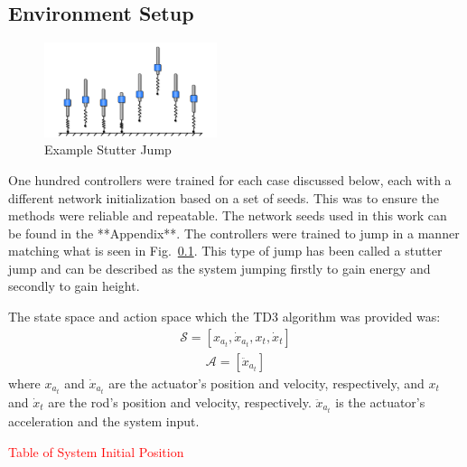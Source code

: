 \documentclass[letterpaper, 10 pt, conference]{ieeeconf}  %
\begin{document}
\subsection{Environment Setup}
% 
\begin{figure}[t]
        \begin{center}
        \includegraphics[width=0.45\textwidth]{figures/Monoped_System/stutter_jump.png}
        \caption{Example Stutter Jump}
        \label{fig:stutterJump} 
        \end{center}
\end{figure}
% 
One hundred controllers were trained for each case discussed below, each with a different network initialization based on a set of seeds. This was to ensure the methods were reliable and repeatable. The network seeds used in this work can be found in the **Appendix**. The controllers were trained to jump in a manner matching what is seen in Fig.~\ref{}. This type of jump has been called a stutter jump and can be described as the system jumping firstly to gain energy and secondly to gain height.

The state space and action space which the TD3 algorithm was provided was:
%
\begin{equation}
        \label{eq:stateSpace}
        \begin{aligned}
                \mathcal{S} = \left[ x_{a_t}, \dot{x}_{a_t}, x_t, \dot{x}_t \right]
        \end{aligned}
\end{equation}
%     
\begin{equation}
        \label{eq:stateSpace}
        \begin{aligned}
                \mathcal{A} = [\ddot{x}_{a_t}]
        \end{aligned}
\end{equation}
%
where $x_{a_t}$ and $\dot{x}_{a_t}$ are the actuator's position and velocity, respectively, and $x_{t}$ and $\dot{x}_{t}$ are the rod's position and velocity, respectively. $\ddot{x}_{a_t}$ is the actuator's acceleration and the system input.

\textcolor{red}{Table of System Initial Position}
\end{document}
